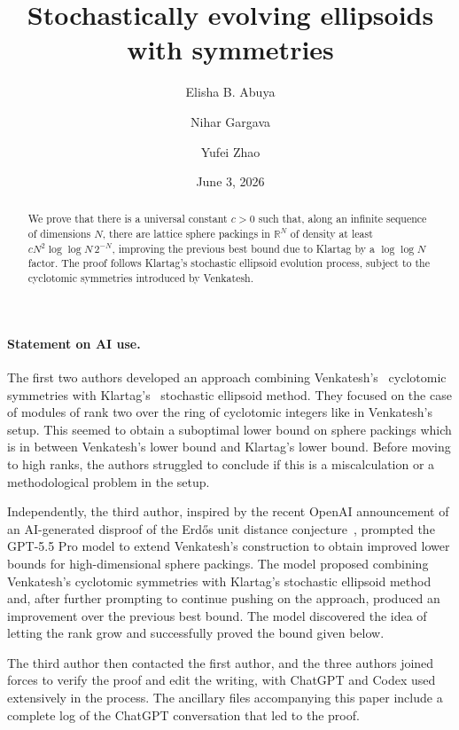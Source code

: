 \documentclass[11pt]{article}
\title{Stochastically evolving ellipsoids with symmetries}
\author{Elisha B. Abuya \and Nihar Gargava \and Yufei Zhao}
\date{June 3, 2026}
\theoremstyle{remark}
\begin{document}
\maketitle


\begin{abstract}
We prove that there is a universal constant $c>0$ such that, along an infinite
sequence of dimensions $N$, there are lattice sphere packings in $\mathbb R^N$
of density at least $cN^2\log\log N\,2^{-N}$, improving the previous best bound
due to Klartag by a $\log\log N$ factor.  The proof follows Klartag's stochastic
ellipsoid evolution process, subject to the cyclotomic symmetries
introduced by Venkatesh.
\end{abstract}

\paragraph*{Statement on AI use.}

The first two authors developed an approach combining
Venkatesh's~\cite{Venkatesh} cyclotomic symmetries with
Klartag's~\cite{Klartag} stochastic ellipsoid method.
They focused on the case
of modules of rank two over the ring of cyclotomic integers like in Venkatesh's setup.
This seemed to obtain a suboptimal lower bound on sphere packings which is in between 
Venkatesh's lower bound and Klartag's lower bound.
Before moving to high ranks, the authors struggled to conclude if this is a miscalculation or a methodological problem
in the setup.


Independently, the third author, inspired by the recent OpenAI announcement
of an AI-generated disproof of the Erd\H{o}s unit distance
conjecture~\cite{ABGLSSTWW, OpenAI}, prompted the
GPT-5.5 Pro model to extend Venkatesh's construction to obtain improved lower
bounds for high-dimensional sphere packings.  The model proposed combining
Venkatesh's cyclotomic symmetries with Klartag's stochastic ellipsoid method
and, after further prompting to continue pushing on the approach, produced an
improvement over the previous best bound.  The model discovered the idea of letting the rank grow and successfully
proved the bound given below.

The third author then contacted the first author, and the three authors
joined forces to verify the proof and edit the writing, with ChatGPT and Codex
used extensively in the process.  The ancillary files accompanying this paper
include a complete log of the ChatGPT conversation that led to the proof.
\end{document}
